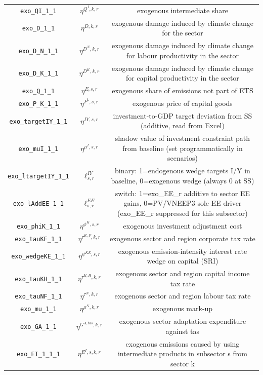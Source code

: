 \begin{center}
\begin{longtable}{ccc}
\texttt{exo\_QI\_1\_1} & ${\eta^{Q^{I},k,r}}$ & exogenous intermediate share\\
\texttt{exo\_D\_1\_1} & ${\eta^{D,k,r}}$ & exogenous damage induced by climate change for the sector\\
\texttt{exo\_D\_N\_1\_1} & ${\eta^{D^{N},k,r}}$ & exogenous damage induced by climate change for labour productivity in the sector\\
\texttt{exo\_D\_K\_1\_1} & ${\eta^{D^{K},k,r}}$ & exogenous damage induced by climate change for capital productivity in the sector\\
\texttt{exo\_Q\_1\_1} & ${\eta^{E,s,r}}$ & exogenous share of emissions not part of ETS\\
\texttt{exo\_P\_K\_1\_1} & ${\eta^{P^k,s,r}}$ & exogenous price of capital goods\\
\texttt{exo\_targetIY\_1\_1} & ${\eta^{IY,s,r}}$ & investment-to-GDP target deviation from SS (additive, read from Excel)\\
\texttt{exo\_muI\_1\_1} & ${\eta^{\mu^{I},s,r}}$ & shadow value of investment constraint path from baseline (set programmatically in scenarios)\\
\texttt{exo\_ltargetIY\_1\_1} & ${\ell^{IY}_{s,r}}$ & binary: 1=endogenous wedge targets I/Y in baseline, 0=exogenous wedge (always 0 at SS)\\
\texttt{exo\_lAddEE\_1\_1} & ${\ell^{EE}_{s,r}}$ & switch: 1=exo\_EE\_r additive to sector EE gains, 0=PV/VNEEP3 sole EE driver (exo\_EE\_r suppressed for this subsector)\\
\texttt{exo\_phiK\_1\_1} & ${\eta^{\phi^{K},{s,r}}}$ & exogenous investment adjustment cost\\
\texttt{exo\_tauKF\_1\_1} & ${\eta^{\tau^{K,F},k,r}}$ & exogenous sector and region corporate tax rate\\
\texttt{exo\_wedgeKE\_1\_1} & ${\eta^{\psi^{KE},s,r}}$ & exogenous emission-intensity interest rate wedge on capital (SRI)\\
\texttt{exo\_tauKH\_1\_1} & ${\eta^{\tau^{K,H},k,r}}$ & exogenous sector and region capital income tax rate\\
\texttt{exo\_tauNF\_1\_1} & ${\eta^{\tau^{N},k,r}}$ & exogenous sector and region labour tax rate\\
\texttt{exo\_mu\_1\_1} & ${\eta^{\mu^{N},k,r}}$ & exogenous mark-up\\
\texttt{exo\_GA\_1\_1} & ${\eta^{G^{A,tas},k,r}}$ & exogenous sector adaptation expenditure against tas\\
\texttt{exo\_EI\_1\_1\_1} & ${\eta^{E^{I},s,k,r}}$ & exogenous emissions caused by using intermediate products in subsector s from sector k\\

\end{longtable}
\end{center}
